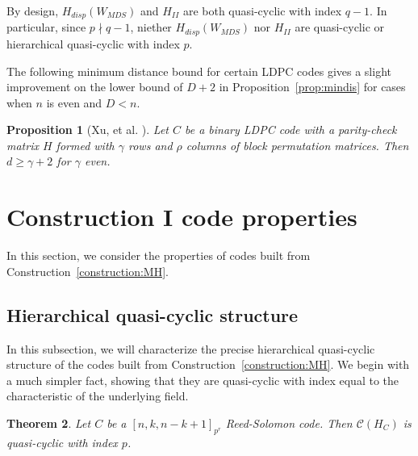 \documentclass[11pt]{amsart}
\newtheorem{theorem}{Theorem}[section]
\newtheorem{proposition}[theorem]{Proposition}
\theoremstyle{definition}
\newcommand{\0}{\mathbf{0}}
\begin{document}
By design, $H_{disp}(W_{MDS})$ and $H_{II}$ are both quasi-cyclic with index $q-1$. In particular, since $p\nmid q-1$, niether $H_{disp}(W_{MDS})$ nor $H_{II}$ are quasi-cyclic or hierarchical quasi-cyclic with index $p$. 
    
The following minimum distance bound for certain LDPC codes gives a slight improvement on the lower bound of $D+2$ in Proposition~\ref{prop:mindis} for cases when $n$ is even and $D<n$.  
\begin{proposition}[Xu, et al. \cite{xu2006construction}] \label{prop:dmin-LDPC} Let $C$ be a binary LDPC code with a parity-check matrix $H$ formed with  $\gamma$ rows and $\rho$ columns of block permutation matrices. Then $d\geq \gamma+2$ for $\gamma$ even. 
\end{proposition}


\section{Construction I code properties} \label{sec:parameters}

In this section, we consider the properties of codes built from Construction~\ref{construction:MH}.



\subsection{Hierarchical quasi-cyclic structure}

In this subsection, we will characterize the precise hierarchical quasi-cyclic structure of the codes built from Construction~\ref{construction:MH}. We begin with a much simpler fact, showing that they are quasi-cyclic with index equal to the characteristic of the underlying field. 

\begin{theorem} \label{thm:qc}
    Let $C$ be a $[n,k,n-k+1]_{p^r}$ Reed-Solomon code. Then $\mathcal{C}(H_C)$ is quasi-cyclic with index $p$. 
\end{theorem}
\end{document}

